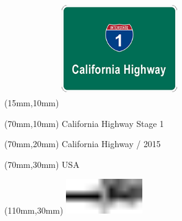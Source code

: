 \null\newpage
\begin{textblock*}{50mm}(15mm,10mm)%
\includegraphics[width=50mm]{LG/CAL.png}
\end{textblock*}
\begin{textblock*}{130mm}(70mm,10mm)%
{\fontsize{20}{20}\selectfont California Highway Stage 1}\\
\end{textblock*}
\begin{textblock*}{120mm}(70mm,20mm)%
{\fontsize{16}{16}\selectfont California Highway / 2015}\\
\end{textblock*}
\begin{textblock*}{120mm}(70mm,30mm)%
{\fontsize{12}{12}\selectfont USA}
\end{textblock*}
\begin{textblock*}{30mm}(110mm,30mm)%
\centering
\includegraphics[height=15mm]{icons/tofinish.pdf}
\end{textblock*}
